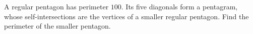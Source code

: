 A regular pentagon has perimeter $100$. Its five diagonals form a pentagram, whose self-intersections are the vertices of a smaller regular pentagon. Find the perimeter of the smaller pentagon.
